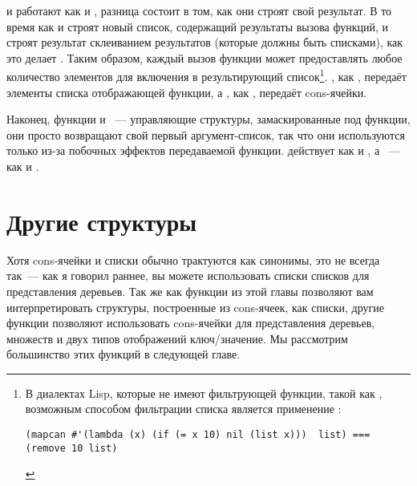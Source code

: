  и  работают как  и , разница состоит
в том, как они строят свой результат. В то время как  и  строят
новый список, содержащий результаты вызова функций,  и  строят
результат склеиванием результатов (которые должны быть списками), как это делает
. Таким образом, каждый вызов функции может предоставлять любое количество
элементов для включения в результирующий список\footnote{В диалектах Lisp, которые не
  имеют фильтрующей функции, такой как , возможным способом фильтрации списка
  является применение :

\begin{lstlisting}
(mapcan #'(lambda (x) (if (= x 10) nil (list x)))  list) === (remove 10 list)
\end{lstlisting}
}. , как , передаёт элементы списка отображающей функции, а
, как , передаёт cons-ячейки.

Наконец, функции  и ~--- управляющие структуры, замаскированные под
функции, они просто возвращают свой первый аргумент-список, так что они используются
только из-за побочных эффектов передаваемой функции.  действует как
 и , а ~--- как  и .


\section{Другие структуры}

Хотя cons-ячейки и списки обычно трактуются как синонимы, это не всегда так~--- как я
говорил раннее, вы можете использовать списки списков для представления деревьев. Так же
как функции из этой главы позволяют вам интерпретировать структуры, построенные из
cons-ячеек, как списки, другие функции позволяют использовать cons-ячейки для
представления деревьев, множеств и двух типов отображений ключ/значение. Мы рассмотрим
большинство этих функций в следующей главе.

